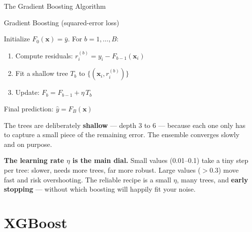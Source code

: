 \documentclass[aspectratio=169, 11pt]{beamer}
\begin{document}
\begin{frame}{The Gradient Boosting Algorithm}
  \begin{definitionbox}{Gradient Boosting (squared-error loss)}
    {\footnotesize
    Initialize $F_0(\mathbf{x}) = \bar{y}$. For $b = 1, \ldots, B$:
    \begin{enumerate}\itemsep0pt
      \item Compute residuals: $r_i^{(b)} = y_i - F_{b-1}(\mathbf{x}_i)$
      \item Fit a shallow tree $T_b$ to $\{(\mathbf{x}_i, r_i^{(b)})\}$
      \item Update: $F_b = F_{b-1} + \eta\, T_b$
    \end{enumerate}
    Final prediction: $\hat{y} = F_B(\mathbf{x})$
    }
  \end{definitionbox}
  The trees are deliberately \textbf{shallow} --- depth 3 to 6 --- because each one only has
  to capture a small piece of the remaining error. The ensemble converges slowly and on
  purpose.

  \vspace{0.15cm}
  \textbf{The learning rate $\eta$ is the main dial.} Small values (0.01--0.1) take a tiny
  step per tree: slower, needs more trees, far more robust. Large values ($> 0.3$) move fast
  and risk overshooting. The reliable recipe is a small $\eta$, many trees, and
  \textbf{early stopping} --- without which boosting will happily fit your noise.
\end{frame}

\section{XGBoost}

\end{document}
